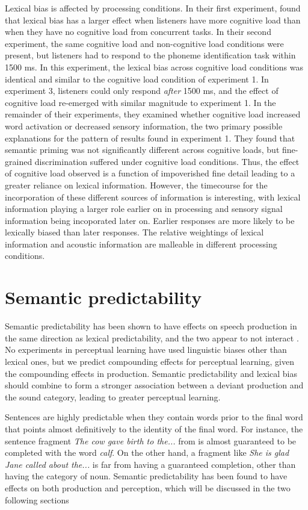 Lexical bias is affected by processing conditions.  
In their first experiment, \citet{Mattys2011} found that lexical bias has a larger effect when listeners have more cognitive load than when they have no cognitive load from concurrent tasks.  
In their second experiment, the same cognitive load and non-cognitive load conditions were present, but listeners had to respond to the phoneme identification task within 1500 ms.  
In this experiment, the lexical bias across cognitive load conditions was identical and similar to the cognitive load condition of experiment 1.  
In experiment 3, listeners could only respond \emph{after} 1500 ms, and the effect of cognitive load re-emerged with similar magnitude to experiment 1.  
In the remainder of their experiments, they examined whether cognitive load increased word activation or decreased sensory information, the two primary possible explanations for the pattern of results found in experiment 1.  
They found that semantic priming was not significantly different across cognitive loads, but fine-grained discrimination suffered under cognitive load conditions.  
Thus, the effect of cognitive load observed is a function of impoverished fine detail leading to a greater reliance on lexical information.  
However, the timecourse for the incorporation of these different sources of information is interesting, with lexical information playing a larger role earlier on in processing and sensory signal information being incoporated later on.  
Earlier responses are more likely to be lexically biased than later responses.
The relative weightings of lexical information and acoustic information are malleable in different processing conditions.

\section{Semantic predictability}

Semantic predictability has been shown to have effects on speech production in the same direction as lexical predictability, and the two appear to not interact \citep{Scarborough2010}.  No experiments in perceptual learning have used linguistic biases other than lexical ones, but we predict compounding effects for perceptual learning, given the compounding effects in production.  Semantic predictability and lexical bias should combine to form a stronger association between a deviant production and the sound category, leading to greater perceptual learning.

Sentences are highly predictable when they contain words prior to the final word that points almost definitively to the identity of the final word.  
For instance, the sentence fragment \emph{The cow gave birth to the...} from \citet{Kalikow1977} is almost guaranteed to be completed with the word \emph{calf}.  
On the other hand, a fragment like \emph{She is glad Jane called about the...} is far from having a guaranteed completion, other than having the category of noun. 
Semantic predictability has been found to have effects on both production and perception, which will be discussed in the two following sections

